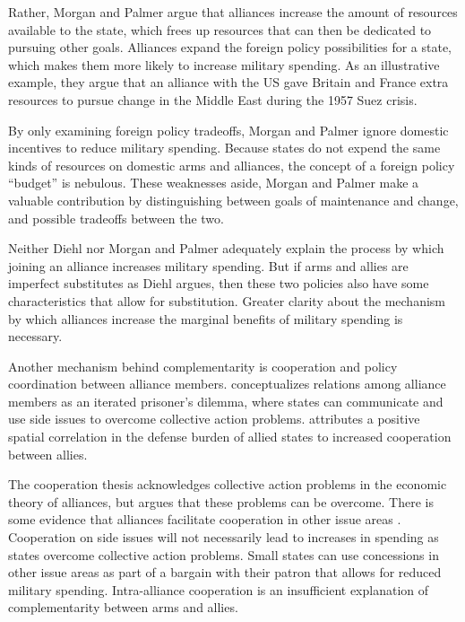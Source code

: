 \documentclass[12pt]{article}
\begin{document}
Rather, Morgan and Palmer argue that alliances increase the amount of resources available to the state, which frees up resources that can then be dedicated to pursuing other goals. Alliances expand the foreign policy possibilities for a state, which makes them more likely to increase military spending. As an illustrative example, they argue that an alliance with the US gave Britain and France extra resources to pursue change in the Middle East during the 1957 Suez crisis.  

By only examining foreign policy tradeoffs, Morgan and Palmer ignore domestic incentives to reduce military spending. Because states do not expend the same kinds of resources on domestic arms and alliances, the concept of a foreign policy ``budget'' is nebulous. These weaknesses aside, Morgan and Palmer make a valuable contribution by distinguishing between goals of maintenance and change, and possible tradeoffs between the two.

Neither Diehl nor Morgan and Palmer adequately explain the process by which joining an alliance increases military spending. But if arms and allies are imperfect substitutes as Diehl argues, then these two policies also have some characteristics that allow for substitution. Greater clarity about the mechanism by which alliances increase the marginal benefits of military spending is necessary. 

Another mechanism behind complementarity is cooperation and policy coordination between alliance members. \citet{Palmer1990} conceptualizes relations among alliance members as an iterated prisoner's dilemma, where states can communicate and use side issues to overcome collective action problems. \citet{QuirozFlores2011} attributes a positive spatial correlation in the defense burden of allied states to increased cooperation between allies.

The cooperation thesis acknowledges collective action problems in the economic theory of alliances, but argues that these problems can be overcome. There is some evidence that alliances facilitate cooperation in other issue areas \citep{Gowa1995, GowaMansfield2004, Poast2012, Poast2013}. Cooperation on side issues will not necessarily lead to increases in spending as states overcome collective action problems. Small states can use concessions in other issue areas as part of a bargain with their patron that allows for reduced military spending. Intra-alliance cooperation is an insufficient explanation of complementarity between arms and allies. 
\end{document}
